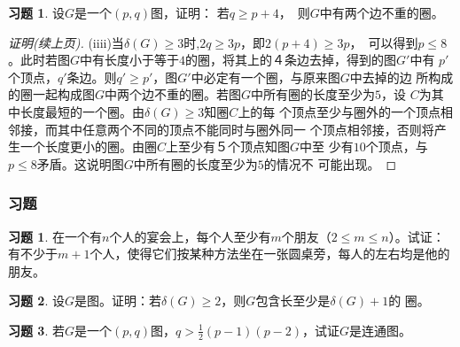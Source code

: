 \documentclass{beamer}
\theoremstyle{definition}
\theoremstyle{example}
\newtheorem*{Exercise1}{习题}
\begin{document}
\begin{CJK*}{UTF8}{gbsn}
\begin{frame}
    \begin{Exercise1}
    设$G$是一个$(p,q)$图，证明：
    若$q \geq p + 4$，　则$G$中有两个边不重的圈。
  \end{Exercise1}
  \begin{proof}[证明(续上页)]


    (iiii)当$\delta(G)\geq 3$时,$2q\geq 3p$，即$2(p+4) \geq 3p$，　可以得到$p \leq
    8$。此时若图$G$中有长度小于等于$4$的圈，将其上的４条边去掉，得到的图$G'$中有
    $p'$个顶点，$q'$条边。则$q'\geq p'$，图$G'$中必定有一个圈，与原来图$G$中去掉的边
    所构成的圈一起构成图$G$中两个边不重的圈。若图$G$中所有圈的长度至少为$5$，设
    $C$为其中长度最短的一个圈。由$\delta(G)\geq 3$知圈$C$上的每
    个顶点至少与圈外的一个顶点相邻接，而其中任意两个不同的顶点不能同时与圈外同一
    个顶点相邻接，否则将产生一个长度更小的圈。由圈$C$上至少有５个顶点知图$G$中至
    少有$10$个顶点，与$p \leq 8$矛盾。这说明图$G$中所有圈的长度至少为$5$的情况不
    可能出现。
  \end{proof}

\end{frame}
\newtheorem{Exercise}{习题}

\begin{frame}
  \frametitle{习题}
  \begin{Exercise}
    在一个有$n$个人的宴会上，每个人至少有$m$个朋友（$2 \leq m \leq n$）。试证：
    有不少于$m+1$个人，使得它们按某种方法坐在一张圆桌旁，每人的左右均是他的朋友。
  \end{Exercise}
  \begin{Exercise}
    设$G$是图。证明：若$\delta (G) \geq 2$，则$G$包含长至少是$\delta (G) + 1$的
    圈。
  \end{Exercise}
  \begin{Exercise}
      若$G$是一个$(p,q)$图，$q > \frac{1}{2}(p-1)(p-2)$，试证$G$是连通图。  
  \end{Exercise}
\end{frame}



\end{CJK*}
\end{document}
